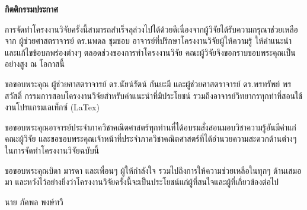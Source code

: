 \thispagestyle{empty}
\vspace{2 cm}
{\huge \bf กิตติกรรมประกาศ}
\vspace{2 cm}

\hspace{1cm}การจัดทำโครงงานวิจัยครั้งนี้สามารถสำเร็จลุล่วงไปได้ด้วยดีเนื่องจากผู้วิจัยได้รับความกรุณาช่วยเหลือจาก ผู้ช่วยศาสตราจารย์ ดร.นพดล ชุมชอบ อาจารย์ที่ปรึกษาโครงงานวิจัยผู้ให้ความรู้ ให้คำแนะนำและแก้ไขข้อบกพร่องต่างๆ ตลอดช่วงของการทำโครงงานวิจัย คณะผู้วิจัยจึงขอกราบขอบพระคุณเป็นอย่างสูง ณ โอกาสนี้

\hspace{1cm}ขอขอบพระคุณ ผู้ช่วยศาสตราจารย์ ดร.นัยน์รัตน์ กันยะมี และผู้ช่วยศาสตราจารย์ ดร.พรทรัพย์ พรสวัสดิ์ กรรมการสอบโครงงานวิจัยสำหรับคำแนะนำที่มีประโยชน์ รวมถึงอาจารย์วิทยากรทุกท่าที่สอนใช้งานโปรแกรมเลเท็กซ์ (LaTex)

\hspace{1cm}ขอขอบพระคุณอาจารย์ประจำภาควิชาคณิตศาสตร์ทุกท่านที่ได้อบรมสั่งสอนมอบวิชาความรู้อันมีค่าแก่คณะผู้วิจัย และขอขอบพระคุณเจ้าหน้าที่ประจำภาควิชาคณิตศาสตร์ที่ได้อำนวยความสะดวกด้านต่างๆ ในการจัดทำโครงงานวิจัยฉบับนี้

\hspace{1cm}ขอขอบพระคุณบิดา มารดา และเพื่อนๆ ผู้ให้กำลังใจ รวมไปถึงการให้ความช่วยเหลือในทุกๆ ด้านเสมอมา และหวังไว้อย่างยิ่งว่าโครงงานวิจัยครั้งนี้จะเป็นประโยชน์แก่ผู้ที่สนใจและผู้ที่เกี่ยวข้องต่อไป

\vspace{2cm}
\hspace*{\fill} นาย ภัคพล พงษ์ทวี


\newpage
